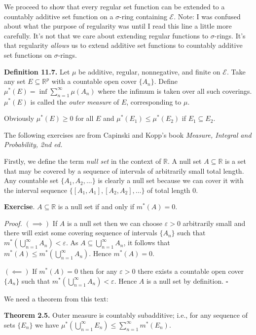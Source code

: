 \documentclass[a4paper]{article}
\newcommand{\R}{\mathbb{R}}
\begin{document}
We proceed to show that every regular set function can be extended to a countably additive set function on a $\sigma$-ring containing $\mathscr{E}$. Note: I was confused about what the purpose of regularity was until I read this line a little more carefully. It's not that we care about extending regular functions to $\sigma$-rings. It's that regularity \emph{allows} us to extend additive set functions to countably additive set functions on $\sigma$-rings.

\textbf{Definition 11.7.} Let $\mu$ be additive, regular, nonnegative, and finite on $\mathscr{E}$. Take any set $E \subseteq \R^p$ with a countable open cover $\{A_n\}$. Define $\mu^*(E) = \inf\sum_{n=1}^\infty \mu(A_n)$ where the infimum is taken over all such coverings. $\mu^*(E)$ is called the \emph{outer measure} of $E$, corresponding to $\mu$.

Obviously $\mu^*(E) \geq 0$ for all $E$ and $\mu^*(E_1) \leq \mu^*(E_2)$ if $E_1 \subseteq E_2$.

The following exercises are from Capinski and Kopp's book \emph{Measure, Integral and Probability, 2nd ed.}

Firstly, we define the term \emph{null set} in the context of $\R$. A null set $A \subseteq \R$ is a set that may be covered by a sequence of intervals of arbitrarily small total length. Any countable set $\{A_1, A_2, \ldots\}$ is clearly a null set because we can cover it with the interval sequence $\{[A_1, A_1], [A_2, A_2], \ldots\}$ of total length $0$.

\textbf{Exercise}. $A \subseteq \R$ is a null set if and only if $m^*(A) = 0$.

\emph{Proof.} $(\implies)$ If $A$ is a null set then we can choose $\varepsilon > 0$ arbitrarily small and there will exist some covering sequence of intervals $\{A_n\}$ such that $m^*\left(\bigcup_{n=1}^\infty A_n\right) < \varepsilon$. As $A \subseteq \bigcup_{n=1}^\infty A_n$, it follows that $m^*(A) \leq m^*\left(\bigcup_{n=1}^\infty A_n\right)$. Hence $m^*(A) = 0$.

$(\impliedby)$ If $m^*(A) = 0$ then for any $\varepsilon > 0$ there exists a countable open cover $\{A_n\}$ such that $m^*\left(\bigcup_{n=1}^\infty A_n\right) < \varepsilon$. Hence $A$ is a null set by definition. $\square$

We need a theorem from this text:

\textbf{Theorem 2.5.} Outer measure is countably subadditive; i.e., for any sequence of sets $\{E_n\}$ we have $\mu^*\left(\bigcup_{n=1}^\infty E_n\right) \leq \sum_{n=1}^\infty m^*(E_n)$.
\end{document}
